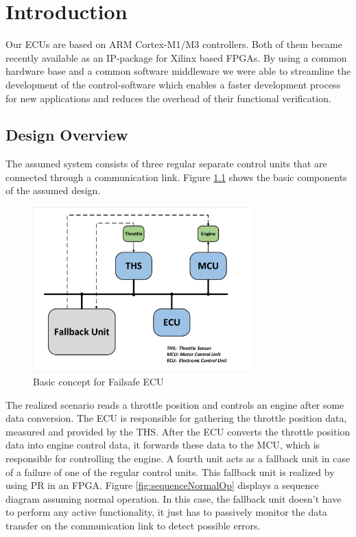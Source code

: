 \chapter{Introduction}

Our \glspl{ECU} are based on ARM Cortex-M1/M3 controllers. Both of them became recently available as an \gls{IP}-package for Xilinx based \glspl{FPGA}.
By using a common hardware base and a common software middleware we were able to streamline the development of the control-software which enables a faster development process for new applications and reduces the overhead of their functional verification.

\section{Design Overview}

The assumed system consists of three regular separate control units that are connected through a communication link. Figure \ref{fig:basicDesign} shows the basic components of the assumed design.

\begin{figure}[h!]
    \centering
    \includegraphics[width=0.75\textwidth]{figures/basic_design.pdf}
    \caption{Basic concept for Failsafe ECU}\label{fig:basicDesign}
\end{figure}

The realized scenario reads a throttle position and controls an engine after some data conversion. The \gls{ECU} is responsible for gathering the throttle position data, measured and provided by the \gls{THS}. After the \gls{ECU} converts the throttle position data into engine control data, it forwards these data to the \gls{MCU}, which is responsible for controlling the engine. A fourth unit acts as a fallback unit in case of a failure of one of the regular control units. This fallback unit is realized by using \gls{PR} in an \gls{FPGA}. Figure \ref{fig:sequenceNormalOp} displays a sequence diagram assuming normal operation. In this case, the fallback unit doesn't have to perform any active functionality, it just has to passively monitor the data transfer on the communication link to detect possible errors.

